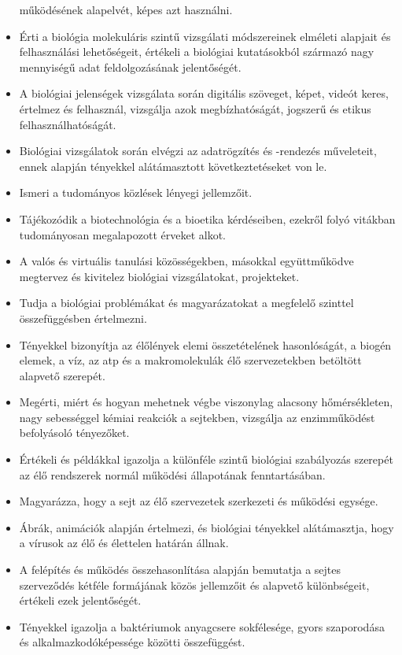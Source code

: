 \begin{itemize}
  működésének alapelvét, képes azt használni.
\item
  Érti a biológia molekuláris szintű vizsgálati módszereinek elméleti
  alapjait és felhasználási lehetőségeit, értékeli a biológiai
  kutatásokból származó nagy mennyiségű adat feldolgozásának
  jelentőségét.
\item
  A biológiai jelenségek vizsgálata során digitális szöveget, képet,
  videót keres, értelmez és felhasznál, vizsgálja azok megbízhatóságát,
  jogszerű és etikus felhasználhatóságát.
\item
  Biológiai vizsgálatok során elvégzi az adatrögzítés és -rendezés
  műveleteit, ennek alapján tényekkel alátámasztott következtetéseket
  von le.
\item
  Ismeri a tudományos közlések lényegi jellemzőit.
\item
  Tájékozódik a biotechnológia és a bioetika kérdéseiben, ezekről folyó
  vitákban tudományosan megalapozott érveket alkot.
\item
  A valós és virtuális tanulási közösségekben, másokkal együttműködve
  megtervez és kivitelez biológiai vizsgálatokat, projekteket.
\item
  Tudja a biológiai problémákat és magyarázatokat a megfelelő szinttel
  összefüggésben értelmezni.
\item
  Tényekkel bizonyítja az élőlények elemi összetételének hasonlóságát, a
  biogén elemek, a víz, az atp és a makromolekulák élő szervezetekben
  betöltött alapvető szerepét.
\item
  Megérti, miért és hogyan mehetnek végbe viszonylag alacsony
  hőmérsékleten, nagy sebességgel kémiai reakciók a sejtekben, vizsgálja
  az enzimműködést befolyásoló tényezőket.
\item
  Értékeli és példákkal igazolja a különféle szintű biológiai
  szabályozás szerepét az élő rendszerek normál működési állapotának
  fenntartásában.
\item
  Magyarázza, hogy a sejt az élő szervezetek szerkezeti és működési
  egysége.
\item
  Ábrák, animációk alapján értelmezi, és biológiai tényekkel
  alátámasztja, hogy a vírusok az élő és élettelen határán állnak.
\item
  A felépítés és működés összehasonlítása alapján bemutatja a sejtes
  szerveződés kétféle formájának közös jellemzőit és alapvető
  különbségeit, értékeli ezek jelentőségét.
\item
  Tényekkel igazolja a baktériumok anyagcsere sokfélesége, gyors
  szaporodása és alkalmazkodóképessége közötti összefüggést.

\end{itemize}
